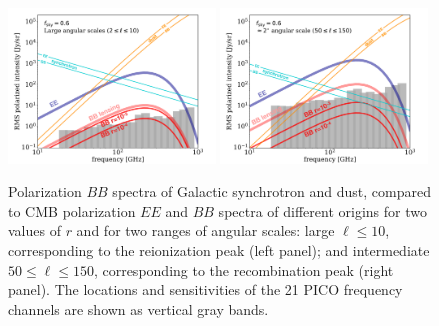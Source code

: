 \documentclass[PICOReport.tex]{subfiles}
\begin{document}
\begin{figure}[ht]
\includegraphics[width=0.49\textwidth]{images/sensitivity_vs_frequency_Jan3_2019_large_scale_v2.pdf}
\includegraphics[width=0.49\textwidth]{images/sensitivity_vs_frequency_Jan3_2019_2deg_scale_v2.pdf}
\vspace{-0.1in}
\caption{\captiontext
Polarization $BB$ spectra of Galactic synchrotron and dust, compared to CMB polarization $EE$ and $BB$ spectra of different origins for two values of $r$ and for two ranges of angular scales: large $\ell \leq 10$, corresponding to the reionization peak (left panel); and intermediate $50 \leq \ell \leq 150$, corresponding to the recombination peak (right panel). The locations and sensitivities of the 21 PICO frequency channels are shown as vertical gray bands. 
\label{fig:pico-channels-and-fg} }
\end{figure}
\end{document}
